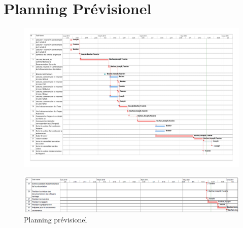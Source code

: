 \documentclass[12pt,a4paper]{report}
\begin{document}
\section{Planning Prévisionel}
\begin{figure}[!ht]
\hspace*{-3.5cm}                
\includegraphics[scale=0.48]{feuille_de_route.pdf}
\end{figure}

\begin{figure}[!ht]
\hspace*{-3cm}                
\includegraphics[scale=0.57]{images/planning_prev_p2.PNG}
\caption{Planning prévisionel}
\end{figure}
\end{document}
